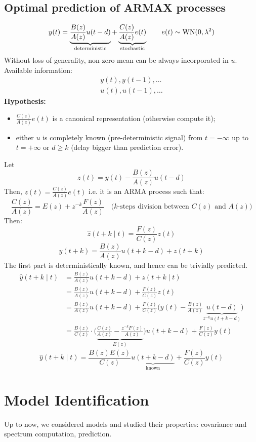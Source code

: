 \section{Optimal prediction of ARMAX processes}

\[
	y(t)=\underbrace{\frac{B(z)}{A(z)} u(t-d)}_{\text{deterministic}}+
	\underbrace{\frac{C(z)}{A(z)} e(t)}_{\text{stochastic}}\qquad e(t)\sim \operatorname{WN}(0,\lambda^2 )
\]
Without loss of generality, non-zero mean can be always incorporated in $u$. Available information:
\begin{gather*}
	y(t),y(t-1),\ldots \\
	u(t),u(t-1),\ldots
\end{gather*}
\textbf{Hypothesis:}
\begin{itemize}
	\item $\frac{C(z)}{A(z)}e(t)$ is a canonical representation (otherwise compute it);
	\item either $u$ is completely known (pre-deterministic signal) from $t=-\infty$ up to $t=+\infty$ or $d\geq k$ (delay bigger than prediction error).
\end{itemize}
Let 
$$
	z(t)=y(t)-\frac{B(z)}{A(z)} u(t-d)
$$
Then, $z(t)=\frac{C(z)}{A(z)} e(t)$ i.e. it is an ARMA process such that:
$$
	\frac{C(z)}{A(z)}=E(z)+z^{-k} \frac{F(z)}{A(z)} \quad\text{($k$-steps division between $C(z)$ and $A(z)$)}
$$
Then:
$$
	\hat{z}(t+k \mid t)=\frac{F(z)}{C(z)} z(t)
$$
$$
	y(t+k)=\frac{B(z)}{A(z)} u(t+k-d)+z(t+k)
$$
The first part is deterministically known, and hence can be trivially predicted.
\begin{align*}
	\hat{y}(t+k \mid t)&=\frac{B(z)}{A(z)} u(t+k-d)+z(t+k \mid t) \\
	&=\frac{B(z)}{A(z)} u(t+k-d)+\frac{F(z)}{C(z)} z(t) \\
	& =\frac{B(z)}{A(z)} u(t+k-d)+\frac{F(z)}{C(z)}\Bigg(y(t)-\frac{B(z)}{A(z)} \underbrace{u(t-d)}_{z^{-k}u(t+k-d)}\Bigg) \\
	&=\frac{B(z)}{C(z)} \cdot\Bigg(\underbrace{\frac{C(z)}{A(z)}-\frac{z^{-k} F(z)}{A(z)}}_{E(z)}\Bigg) u(t+k-d)+\frac{F(z)}{C(z)} y(t)
\end{align*}
$$
	\boxed{\hat{y}(t+k \mid t) =\frac{B(z) E(z)}{C(z)} \underbrace{u(t+k-d)}_{\text{known}}+\frac{F(z)}{C(z)} y(t)}
$$

\chapter{Model Identification}

Up to now, we considered models and studied their properties: covariance and spectrum computation, prediction.

